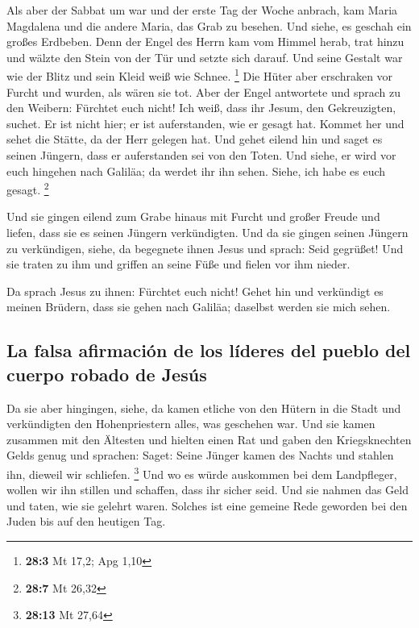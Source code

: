  Als aber der Sabbat um war und der erste Tag der Woche
anbrach, kam Maria Magdalena und die andere Maria, das Grab zu besehen.
 Und siehe, es geschah ein großes Erdbeben. Denn der Engel
des Herrn kam vom Himmel herab, trat hinzu und wälzte den Stein von der
Tür und setzte sich darauf.  Und seine Gestalt war wie der
Blitz und sein Kleid weiß wie Schnee. \footnote{\textbf{28:3} Mt 17,2;
  Apg 1,10}  Die Hüter aber erschraken vor Furcht und
wurden, als wären sie tot.  Aber der Engel antwortete und
sprach zu den Weibern: Fürchtet euch nicht! Ich weiß, dass ihr Jesum,
den Gekreuzigten, suchet.  Er ist nicht hier; er ist
auferstanden, wie er gesagt hat. Kommet her und sehet die Stätte, da der
Herr gelegen hat.  Und gehet eilend hin und saget es
seinen Jüngern, dass er auferstanden sei von den Toten. Und siehe, er
wird vor euch hingehen nach Galiläa; da werdet ihr ihn sehen. Siehe, ich
habe es euch gesagt. \footnote{\textbf{28:7} Mt 26,32}

 Und sie gingen eilend zum Grabe hinaus mit Furcht und
großer Freude und liefen, dass sie es seinen Jüngern verkündigten. Und
da sie gingen seinen Jüngern zu verkündigen,  siehe, da
begegnete ihnen Jesus und sprach: Seid gegrüßet! Und sie traten zu ihm
und griffen an seine Füße und fielen vor ihm nieder.

 Da sprach Jesus zu ihnen: Fürchtet euch nicht! Gehet hin
und verkündigt es meinen Brüdern, dass sie gehen nach Galiläa; daselbst
werden sie mich sehen.

\hypertarget{la-falsa-afirmaciuxf3n-de-los-luxedderes-del-pueblo-del-cuerpo-robado-de-jesuxfas}{%
\subsection{La falsa afirmación de los líderes del pueblo del cuerpo
robado de
Jesús}\label{la-falsa-afirmaciuxf3n-de-los-luxedderes-del-pueblo-del-cuerpo-robado-de-jesuxfas}}

 Da sie aber hingingen, siehe, da kamen etliche von den
Hütern in die Stadt und verkündigten den Hohenpriestern alles, was
geschehen war.  Und sie kamen zusammen mit den Ältesten
und hielten einen Rat und gaben den Kriegsknechten Gelds genug
 und sprachen: Saget: Seine Jünger kamen des Nachts und
stahlen ihn, dieweil wir schliefen. \footnote{\textbf{28:13} Mt 27,64}
 Und wo es würde auskommen bei dem Landpfleger, wollen
wir ihn stillen und schaffen, dass ihr sicher seid.  Und
sie nahmen das Geld und taten, wie sie gelehrt waren. Solches ist eine
gemeine Rede geworden bei den Juden bis auf den heutigen Tag.

